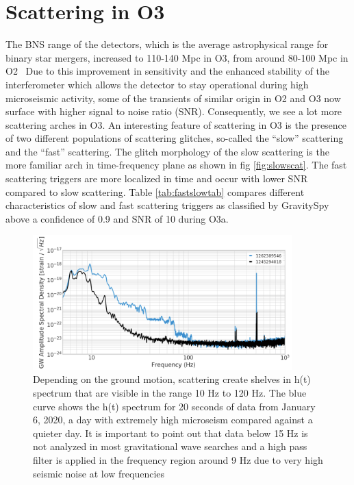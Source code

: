 \documentclass[12pt]{iopart}
\begin{document}
\section{Scattering in O3}\label{scatino3}
The BNS range of the detectors, which is the average astrophysical range for binary star mergers, increased to 110-140 Mpc in O3, from around 80-100 Mpc in O2~\cite{prospect} Due to this improvement in sensitivity and the enhanced stability of the interferometer which allows the detector to stay operational during high microseismic activity, some of the transients of similar origin in O2 and O3 now surface with higher signal to noise ratio (SNR). 
Consequently, we see a lot more scattering arches in O3. An interesting feature of scattering in O3 is the presence of two different populations of scattering glitches, so-called the ``slow'' scattering and the ``fast'' scattering. The glitch morphology of the slow scattering is the more familiar arch in time-frequency plane as shown in fig \ref{fig:slowscat}. The fast scattering triggers are more localized in time and occur with lower SNR compared to slow scattering. Table \ref{tab:fastslowtab} compares different characteristics of slow and fast scattering triggers as classified by GravitySpy above a confidence of 0.9 and SNR of 10 during O3a.
\begin{figure}[h]
    \centering
    \includegraphics[width=10cm]{scat_shelf8.png}
    \caption{ Depending on the ground motion, scattering create shelves in h(t) spectrum that are visible in the range 10 Hz to 120 Hz. The blue curve shows the h(t) spectrum for 20 seconds of data from January 6, 2020, a day with extremely high microseism compared against a quieter day. It is important to point out that data below 15 Hz is not analyzed in most gravitational wave searches and a high pass filter is applied in the frequency region around 9 Hz due to very high seismic noise at low frequencies \cite{viets_thesis}}
    \label{fig:scatshelf1}
\end{figure}
\end{document}
